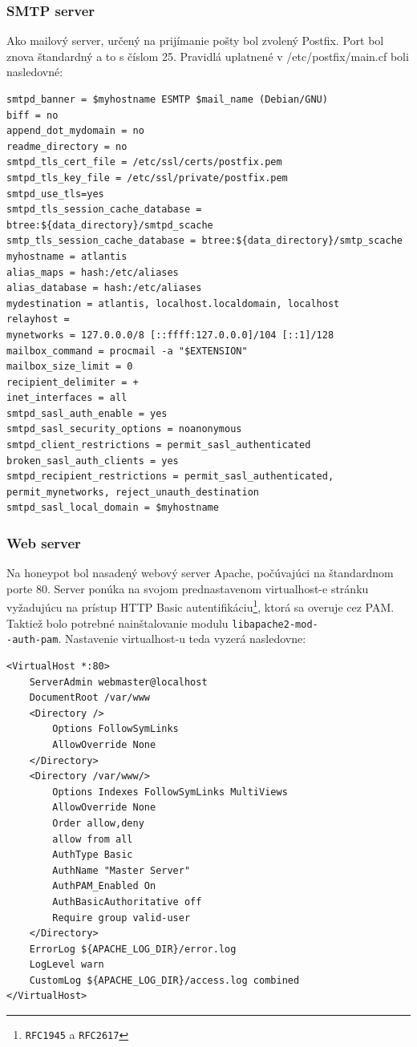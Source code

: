 \documentclass[12pt, oneside]{book}
\begin{document}
\subsubsection{SMTP server}
Ako mailový server, určený na prijímanie pošty bol zvolený Postfix. Port bol znova štandardný a to s číslom 25. Pravidlá uplatnené v /etc/postfix/main.cf boli nasledovné:

\begin{lstlisting}[style=customBash]
smtpd_banner = $myhostname ESMTP $mail_name (Debian/GNU)
biff = no
append_dot_mydomain = no
readme_directory = no
smtpd_tls_cert_file = /etc/ssl/certs/postfix.pem
smtpd_tls_key_file = /etc/ssl/private/postfix.pem
smtpd_use_tls=yes
smtpd_tls_session_cache_database = btree:${data_directory}/smtpd_scache
smtp_tls_session_cache_database = btree:${data_directory}/smtp_scache
myhostname = atlantis
alias_maps = hash:/etc/aliases
alias_database = hash:/etc/aliases
mydestination = atlantis, localhost.localdomain, localhost
relayhost = 
mynetworks = 127.0.0.0/8 [::ffff:127.0.0.0]/104 [::1]/128
mailbox_command = procmail -a "$EXTENSION"
mailbox_size_limit = 0
recipient_delimiter = +
inet_interfaces = all
smtpd_sasl_auth_enable = yes
smtpd_sasl_security_options = noanonymous
smtpd_client_restrictions = permit_sasl_authenticated
broken_sasl_auth_clients = yes
smtpd_recipient_restrictions = permit_sasl_authenticated, permit_mynetworks, reject_unauth_destination
smtpd_sasl_local_domain = $myhostname
\end{lstlisting}

\subsubsection{Web server}
Na honeypot bol nasadený webový server Apache, počúvajúci na štandardnom porte 80.
Server ponúka na svojom prednastavenom virtualhost-e stránku vyžadujúcu na prístup HTTP Basic autentifikáciu\footnote{\texttt{RFC1945} a \texttt{RFC2617}}, ktorá sa overuje cez PAM.
Taktiež bolo potrebné nainštalovanie modulu \texttt{libapache2-mod-}\\\texttt{-auth-pam}. Nastavenie virtualhost-u teda vyzerá nasledovne:

\begin{lstlisting}[style=customBash]
<VirtualHost *:80>
	ServerAdmin webmaster@localhost
	DocumentRoot /var/www
	<Directory />
		Options FollowSymLinks
		AllowOverride None
	</Directory>
	<Directory /var/www/>
		Options Indexes FollowSymLinks MultiViews
		AllowOverride None
		Order allow,deny
		allow from all
		AuthType Basic
		AuthName "Master Server"
		AuthPAM_Enabled On
		AuthBasicAuthoritative off 
		Require group valid-user
	</Directory>
	ErrorLog ${APACHE_LOG_DIR}/error.log
	LogLevel warn
	CustomLog ${APACHE_LOG_DIR}/access.log combined
</VirtualHost>
\end{lstlisting}
\end{document}

